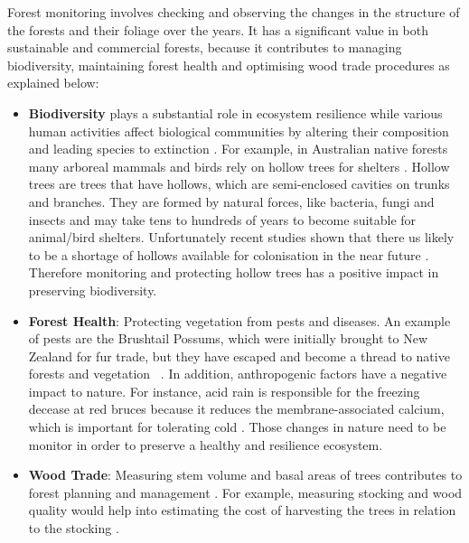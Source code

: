 \documentclass{subfiles}
\begin{document}
Forest monitoring {\color{blue} involves checking and observing the changes in the structure of the forests and their foliage over the years. It has a significant value in both sustainable and commercial forests, because it contributes} to managing biodiversity, maintaining forest health and optimising wood trade procedures as explained below: 
\begin{itemize}
 \item \textbf{Biodiversity} plays a substantial role in ecosystem resilience \cite{Elmqvist2003} while various human activities affect biological communities by altering their composition and leading species to extinction \cite{Hooper2005}.  For example, in Australian native forests many arboreal mammals and birds rely on hollow trees for shelters \cite{Lindenmayer2010} {\color{blue}. Hollow trees are trees that have hollows, which are semi-enclosed cavities on trunks and branches. They are formed by natural forces, like bacteria, fungi and insects and may take tens to hundreds of years to become suitable for animal/bird shelters. Unfortunately recent studies shown that there us likely to be a shortage of hollows available for colonisation in the near future \cite{Goldingay2009}\cite{Gibbons2002}}. Therefore monitoring and protecting hollow trees has a positive impact in preserving biodiversity.
 
 \item \textbf{Forest Health}: Protecting vegetation from pests and diseases. An example of pests are the Brushtail Possums, which were initially brought to New Zealand for fur trade, but they have escaped and become a thread to native forests and vegetation ~\cite{DepartementOfConversation2014}. In addition, anthropogenic factors have a negative impact to nature. For instance, acid rain is responsible for the freezing decease at red bruces because it reduces the membrane-associated calcium, which is important for tolerating cold 
 \cite{DeHayes1999}. Those changes in nature need to be monitor in order to preserve a healthy and resilience ecosystem. 
 
 \item \textbf{Wood Trade}:  Measuring stem volume and basal areas of trees contributes to forest planning and management \cite{Holmgren2004}. For example, measuring stocking and wood quality would help into estimating the cost of harvesting the trees in relation to the stocking \cite{Susana2015}.


\end{itemize}
 
\end{document}
